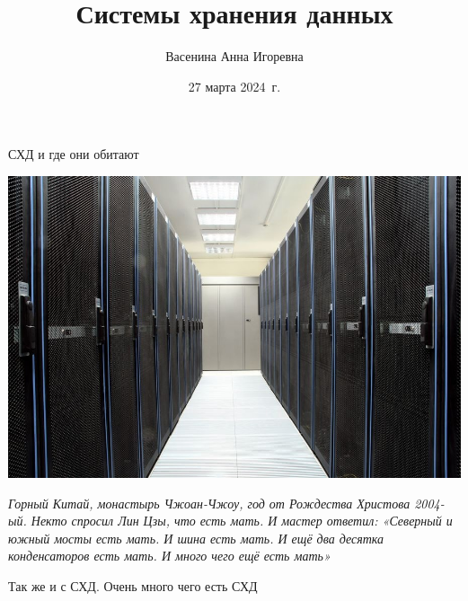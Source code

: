 \documentclass[aspectratio=169]{beamer}
\title[27 марта 2024~г.]{Системы хранения данных}
\author[Васенина А.И.]{Васенина Анна Игоревна}
\date[]{27 марта 2024~г.}
\begin{document}
\begin{frame}
  \titlepage
\end{frame}

\begin{frame}{СХД и где они обитают}
    \begin{minipage}{0.7\linewidth}
    \includegraphics[scale=0.3]{fig/1.servers.jpg}
    \end{minipage}
    \begin{minipage}{0.25\linewidth}
    \vspace{-8em}
    \tiny{\textit{Горный Китай, монастырь Чжоан-Чжоу, год от Рождества Христова 2004-ый. Некто спросил Лин Цзы, что есть мать. И мастер ответил: «Северный и южный мосты есть мать. И шина есть мать. И ещё два десятка конденсаторов есть мать. И много чего ещё есть мать»}}

    \pause
    \vspace{4em}
    \normalsize Так же и с СХД. Очень много чего есть СХД
    \end{minipage}
\end{frame}
\end{document}
